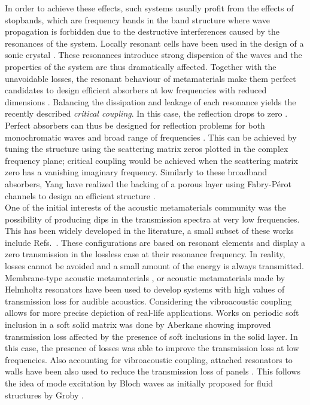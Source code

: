 In order to achieve these effects, such systems usually profit from the effects of stopbands, which are frequency bands in the band structure where wave propagation is forbidden due to the destructive interferences caused by the resonances of the system. Locally resonant cells have been used in the design of a sonic crystal \cite{liuLocallyResonantSonic}. These resonances introduce strong dispersion of the waves and the properties of the system are thus dramatically affected. Together with the unavoidable losses, the resonant behaviour of metamaterials make them perfect candidates to design efficient absorbers at low frequencies with reduced dimensions \cite{jimenez2016, li2016}. Balancing the dissipation and leakage of each resonance yields the recently described \emph{critical coupling}. In this case, the reflection drops to zero \cite{bliokh2008colloquium}. Perfect absorbers can thus be designed for reflection problems for both monochromatic waves \cite{jimenez2016, groby2016use} and broad range of frequencies \cite{jimenez2017, groby2016use,romero2016, Romero2016SCI, guo2021}. This can be achieved by tuning the structure using the scattering matrix zeros plotted in the complex frequency plane; critical coupling would be achieved when the scattering matrix zero has a vanishing imaginary frequency. Similarly to these broadband absorbers, Yang \etal have realized the backing of a porous layer using Fabry-Pérot channels to design an efficient structure \cite{yangSoundAbsorptionStructures2017}.\\

One of the initial interests of the acoustic metamaterials community was the possibility of producing dips in the transmission spectra at very low frequencies. This has been widely developed in the literature, a small subset of these works include Refs.~\cite{auregan2016low, yang2018slow, leng2019limits, lardeau2016broadband}. These configurations are based on resonant elements and display a zero transmission in the lossless case at their resonance frequency. In reality, losses cannot be avoided and a small amount of the energy is always transmitted. Membrane-type acoustic metamaterials \cite{yang2015, wang2018acoustic, romero2016}, or acoustic metamaterials made by Helmholtz resonators \cite{romero2020perfect, long2017asymmetric, long2020tunable} have been used to develop systems with high values of transmission loss for audible acoustics. Considering the vibroacoustic coupling allows for more precise depiction of real-life applications. Works on periodic soft inclusion in a soft solid matrix was done by Aberkane \etal \cite{aberkane-gauthier2024} showing improved transmission loss affected by the presence of soft inclusions in the solid layer. In this case, the presence of losses was able to improve the transmission loss at low frequencies. Also accounting for vibroacoustic coupling, attached resonators to walls have been also used to reduce the transmission loss of panels \cite{yang2013, yang2008}. This follows the idea of mode excitation by Bloch waves as initially proposed for fluid structures by Groby \etal \cite{groby2007, groby2008}.\\ 

